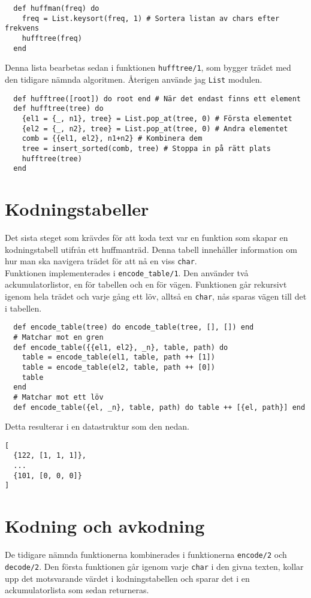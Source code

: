\documentclass[a4paper,11pt]{article}
\begin{document}
\begin{verbatim}
  def huffman(freq) do
    freq = List.keysort(freq, 1) # Sortera listan av chars efter frekvens
    hufftree(freq)
  end
\end{verbatim}

Denna lista bearbetas sedan i funktionen {\tt hufftree/1}, som bygger trädet med den tidigare nämnda algoritmen. Återigen använde jag {\tt List} modulen.

\begin{verbatim}
  def hufftree([root]) do root end # När det endast finns ett element
  def hufftree(tree) do
    {el1 = {_, n1}, tree} = List.pop_at(tree, 0) # Första elementet
    {el2 = {_, n2}, tree} = List.pop_at(tree, 0) # Andra elementet
    comb = {{el1, el2}, n1+n2} # Kombinera dem
    tree = insert_sorted(comb, tree) # Stoppa in på rätt plats
    hufftree(tree)
  end
\end{verbatim}

\section*{Kodningstabeller}
Det sista steget som krävdes för att koda text var en funktion som skapar en kodningstabell utifrån ett huffmanträd. Denna tabell innehåller information om hur man ska navigera trädet för att nå en viss {\tt char}.\\
Funktionen implementerades i {\tt encode\_table/1}. Den använder två ackumulatorlistor, en för tabellen och en för vägen. Funktionen går rekursivt igenom hela trädet och varje gång ett löv, alltså en {\tt char}, nås sparas vägen till det i tabellen.

\begin{verbatim}
  def encode_table(tree) do encode_table(tree, [], []) end
  # Matchar mot en gren
  def encode_table({{el1, el2}, _n}, table, path) do
    table = encode_table(el1, table, path ++ [1])
    table = encode_table(el2, table, path ++ [0])
    table
  end
  # Matchar mot ett löv
  def encode_table({el, _n}, table, path) do table ++ [{el, path}] end
\end{verbatim}
Detta resulterar i en datastruktur som den nedan.
\begin{verbatim}
[
  {122, [1, 1, 1]},
  ...
  {101, [0, 0, 0]}
]  
\end{verbatim}

\section*{Kodning och avkodning}
De tidigare nämnda funktionerna kombinerades i funktionerna {\tt encode/2} och {\tt decode/2}. Den första funktionen går igenom varje {\tt char} i den givna texten, kollar upp det motsvarande värdet i kodningstabellen och sparar det i en ackumulatorlista som sedan returneras.
\end{document}
